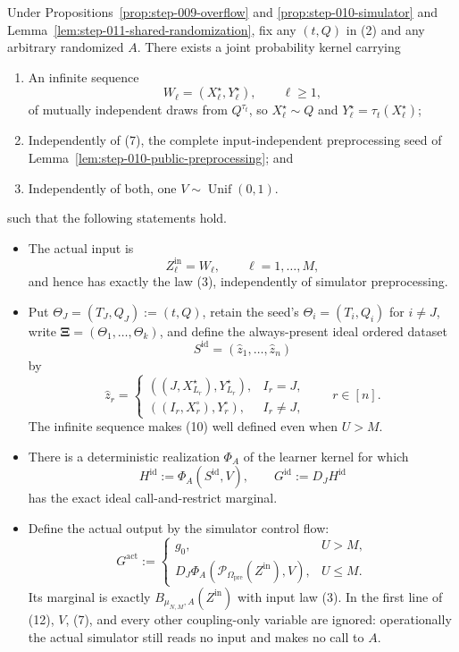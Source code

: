 \begin{lemma}\label{lem:step-011-coupling-kernel}
Under Propositions~\ref{prop:step-009-overflow} and
\ref{prop:step-010-simulator} and
Lemma~\ref{lem:step-011-shared-randomization}, fix any \((t,Q)\) in (2)
and any arbitrary randomized \(A\). There exists a joint probability
kernel carrying

\begin{enumerate}
\item An infinite sequence
   \[
     W_\ell=(X_\ell^\star,Y_\ell^\star),\qquad \ell\ge1,
   \tag{7}
   \]
   of mutually independent draws from \(Q^{\tau_t}\), so
   \(X_\ell^\star\sim Q\) and
   \(Y_\ell^\star=\tau_t(X_\ell^\star)\);
\item Independently of (7), the complete input-independent preprocessing seed
   of Lemma~\ref{lem:step-010-public-preprocessing}; and
\item Independently of both, one \(V\sim\operatorname{Unif}(0,1)\).
\end{enumerate}

such that the following statements hold.

\begin{itemize}
\item The actual input is
  \[
    Z^{\mathrm{in}}_\ell=W_\ell,\qquad \ell=1,\ldots,M,
  \tag{8}
  \]
  and hence has exactly the law (3), independently of simulator
  preprocessing.
\item Put \(\Theta_J=(T_J,Q_J):=(t,Q)\), retain the seed's
  \(\Theta_i=(T_i,Q_i)\) for \(i\ne J\), write
  \(\boldsymbol\Xi=(\Theta_1,\ldots,\Theta_k)\), and define the always-present
  ideal ordered dataset
  \[
    S^{\mathrm{id}}=(\widehat z_1,\ldots,\widehat z_n)
  \tag{9}
  \]
  by
  \[
    \widehat z_r=
    \begin{cases}
      ((J,X_{L_r}^\star),Y_{L_r}^\star),&I_r=J,\\[1mm]
      ((I_r,X_r^\circ),Y_r^\circ),&I_r\ne J,
    \end{cases}
    \qquad r\in[n].
  \tag{10}
  \]
  The infinite sequence makes (10) well defined even when \(U>M\).
\item There is a deterministic realization \(\Phi_A\) of the learner kernel
  for which
  \[
    H^{\mathrm{id}}:=\Phi_A(S^{\mathrm{id}},V),
    \qquad
    G^{\mathrm{id}}:=D_JH^{\mathrm{id}}
  \tag{11}
  \]
  has the exact ideal call-and-restrict marginal.
\item Define the actual output by the simulator control flow:
  \[
    G^{\mathrm{act}}:=
    \begin{cases}
      g_0,&U>M,\\
      D_J\Phi_A(\mathcal P_{\Omega_{\mathrm{pre}}}
                    (Z^{\mathrm{in}}),V),&U\le M.
    \end{cases}
  \tag{12}
  \]
  Its marginal is exactly
  \(B_{\mu_{N,M},A}(Z^{\mathrm{in}})\) with input law (3).
  In the first line of (12), \(V\), (7), and every other coupling-only
  variable are ignored: operationally the actual simulator still reads no
  input and makes no call to \(A\).
\end{itemize}


\end{lemma}
